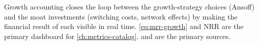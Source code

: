 Growth accounting closes the loop between the growth-strategy choices (Ansoff) and the
moat investments (switching costs, network effects) by making the financial result of each
visible in real time. \cref{eq:mrr-growth} and NRR are the primary dashboard for
\cref{ch:metrics-catalog}. \textcite{ries2011} and \textcite{bendle2020marketing} are the
primary sources.
